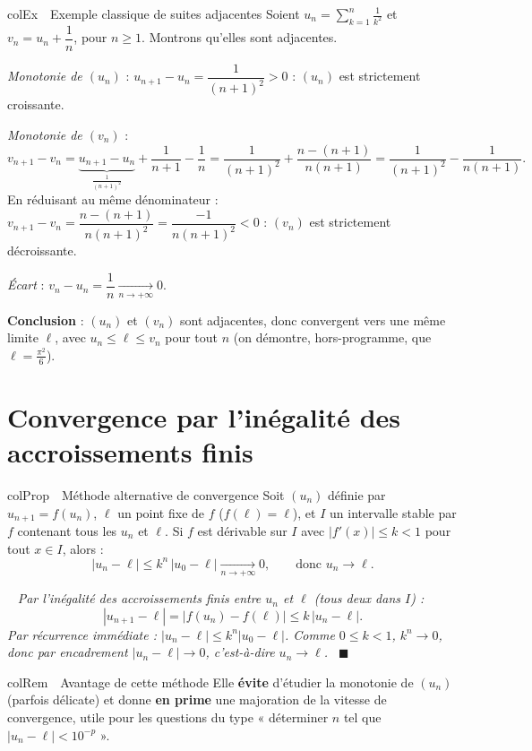 \documentclass[11pt,a4paper]{article}
\newenvironment{propriete}[1][Propriété]
  {\begin{fiche}{colProp}{\ding{72}~~#1}}{\end{fiche}}
\newenvironment{exemple}[1][Exemple]
  {\begin{fiche}{colEx}{\ding{217}~~#1}}{\end{fiche}}
\newenvironment{remarque}[1][Remarque]
  {\begin{fiche}{colRem}{\ding{43}~~#1}}{\end{fiche}}
\newenvironment{demo}
  {\par\smallskip\noindent{\sffamily\bfseries\color{qtealdark}Démonstration.}\ \itshape}
  {\ \normalfont\hfill$\blacksquare$\par\medskip}
\begin{document}
\begin{exemple}[Exemple classique de suites adjacentes]
Soient $u_n=\displaystyle\sum_{k=1}^n\frac{1}{k^2}$ et $v_n=u_n+\dfrac1n$, pour $n\geq1$. Montrons qu'elles sont adjacentes.

\smallskip
\emph{Monotonie de $(u_n)$} : $u_{n+1}-u_n=\dfrac{1}{(n+1)^2}>0$ : $(u_n)$ est strictement croissante.

\smallskip
\emph{Monotonie de $(v_n)$} :
\[
  v_{n+1}-v_n = \underbrace{u_{n+1}-u_n}_{\frac{1}{(n+1)^2}} + \frac{1}{n+1}-\frac1n
  = \frac1{(n+1)^2} + \frac{n-(n+1)}{n(n+1)}
  = \frac1{(n+1)^2} - \frac1{n(n+1)}.
\]
En réduisant au même dénominateur : $v_{n+1}-v_n=\dfrac{n-(n+1)}{n(n+1)^2}=\dfrac{-1}{n(n+1)^2}<0$ : $(v_n)$ est strictement décroissante.

\smallskip
\emph{Écart} : $v_n-u_n=\dfrac1n\xrightarrow[n\to+\infty]{}0$.

\smallskip
\textbf{Conclusion} : $(u_n)$ et $(v_n)$ sont adjacentes, donc convergent vers une même limite $\ell$, avec $u_n\leq\ell\leq v_n$ pour tout $n$ (on démontre, hors-programme, que $\ell=\frac{\pi^2}{6}$).
\end{exemple}

\section{Convergence par l'inégalité des accroissements finis}

\begin{propriete}[Méthode alternative de convergence]
Soit $(u_n)$ définie par $u_{n+1} = f(u_n)$, $\ell$ un point fixe de $f$ ($f(\ell)=\ell$), et $I$ un intervalle stable par $f$ contenant tous les $u_n$ et $\ell$. Si $f$ est dérivable sur $I$ avec $|f'(x)| \leq k < 1$ pour tout $x \in I$, alors :
\[
  |u_n - \ell| \leq k^n\,|u_0 - \ell| \xrightarrow[n \to +\infty]{} 0,
  \qquad\text{donc } u_n \to \ell.
\]
\end{propriete}

\begin{demo}
Par l'inégalité des accroissements finis entre $u_n$ et $\ell$ (tous deux dans $I$) :
\[
  |u_{n+1} - \ell| = |f(u_n) - f(\ell)| \leq k\,|u_n - \ell|.
\]
Par récurrence immédiate : $|u_n - \ell| \leq k^n |u_0 - \ell|$. Comme $0 \leq k < 1$, $k^n \to 0$, donc par encadrement $|u_n - \ell| \to 0$, c'est-à-dire $u_n \to \ell$.
\end{demo}

\begin{remarque}[Avantage de cette méthode]
Elle \textbf{évite} d'étudier la monotonie de $(u_n)$ (parfois délicate) et donne \textbf{en prime} une majoration de la vitesse de convergence, utile pour les questions du type « déterminer $n$ tel que $|u_n - \ell| < 10^{-p}$ ».
\end{remarque}
\end{document}
